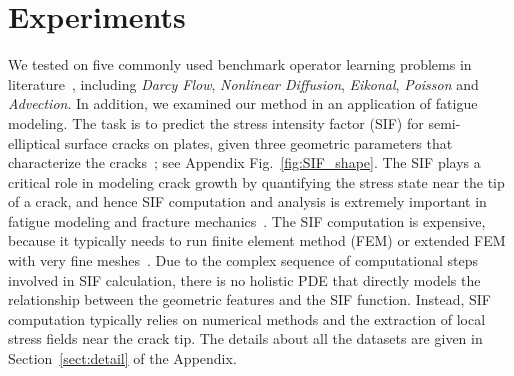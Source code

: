 
\section{Experiments}\label{sect:expr}
We tested on five commonly used benchmark operator learning problems in literature~\citep{li2020fourier,lu2022comprehensive}, including \textit{Darcy Flow}, \textit{Nonlinear Diffusion}, \textit{Eikonal}, \textit{Poisson} and \textit{Advection}.  {In addition, we examined our method in an application of fatigue modeling. The task is to predict the stress intensity factor (SIF) for semi-elliptical surface cracks  on plates, given three geometric parameters that characterize the cracks~\citep{merrell2024stress}; see Appendix Fig.~\ref{fig:SIF_shape}. The SIF plays a critical role in modeling crack growth by quantifying the stress state near the tip of a crack, and hence SIF computation and analysis is extremely important in fatigue modeling and fracture mechanics~\citep{anderson2005fracture}. The SIF computation is expensive, because it typically needs to run finite element method (FEM) or extended FEM with very fine meshes~\citep{kuna2013finite}. 
Due to the complex sequence of computational steps involved in SIF calculation, there is no holistic PDE that directly models the relationship between the geometric features and the SIF function. Instead, SIF computation typically relies on numerical methods and the extraction of local stress fields near the crack tip.} The details about all the datasets are given in Section~\ref{sect:detail} of the Appendix. 

